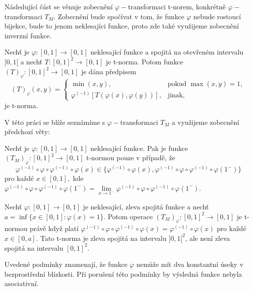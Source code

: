 Následující část se věnuje zobecn\v en\'i $\varphi-$transformaci t-norem, konkr\'etn\v e $\varphi-$transformaci $T_M.$ Zobecn\v en\'i bude spo\v c\'ivat v tom, \v ze funkce $\varphi$ nebude rostouc\'i bijekce, bude to jenom neklesaj\'ici funkce, proto zde tak\'e vyu\v zijeme zobecn\v en\'i inverzn\'i funkce. 
\begin{sentence}\cite{KMP}\label{subnorma}
     Nech\v t je $\varphi : [0,1] \rightarrow [0,1]$ neklesající funkce a  spojitá na otev\v ren\'em intervalu
 $]0,1[$ a nech\v t $T: [0,1]^2 \rightarrow [0,1]$ je t-norma. Potom funkce
    $(T)_\varphi : [0,1]^2 \rightarrow [0,1]$ je dána p\v redpisem $$(T)_\varphi (x,y)= \begin{cases} \min(x,y), & \mbox {pokud } \max(x,y) = 1,
    \\ \varphi^{(-1)}[T(\varphi(x), \varphi(y))], & \mbox {jinak,}
    \end{cases}$$
    je t-norma.
  \end{sentence}
  V této práci se blí\v ze seznámíme s $\varphi-$transformaci $T_M$ a využijeme zobecnění předchozí věty:

\begin{sentence} 
\cite{hlinena}
\label{smut} Nech\v t je $\varphi \colon [0,1] \to [0,1]$ neklesající funkce. Pak je funkce $(T_M)_\varphi\colon[0,1]^2\to[0,1]$  t-normou pouze v případě, že
$$\varphi^{(-1)}\circ\varphi\circ\varphi^{(-1)}\circ\varphi(x)\in \{\varphi^{(-1)}\circ\varphi(x),\varphi^{(-1)}\circ\varphi\circ\varphi^{(-1)}\circ\varphi(1^-)\}$$
pro každé $x\in[0,1],$ kde $\varphi^{(-1)}\circ\varphi\circ\varphi^{(-1)}\circ\varphi(1^-)=\lim\limits_{x\to 1^-}\varphi^{(-1)}\circ\varphi\circ\varphi^{(-1)}\circ\varphi(1^-).$
\end{sentence}
\begin{remark}
\cite{mitav}
    Nech\v t $\varphi\colon[0,1]\to [0,1]$ je neklesající, zleva spojitá  funkce a nechť $a=\inf\{x \in [0,1]\colon \varphi(x)=1\}.$ Potom operace $(T_M)_\varphi\colon[0,1]^2\to[0,1]$ je t-normou právě když platí $\varphi^{(-1)}\circ\varphi\circ\varphi^{(-1)}\circ\varphi(x)=\varphi^{(-1)}\circ\varphi(x)$ pro každé $x \in [0,a].$ Tato  t-norma je zleva spojitá na intervalu  $]0,1[^2$, ale není zleva spojitá na  intervalu $[0,1]^2.$
\end{remark}

Uveden\'e podm\'inky znamenaj\'i, \v ze funkce $\varphi$ nem\r u\v ze m\'it dva konstantn\'i \'useky v bezprost\v redn\'i bl\'izkosti. P\v ri poru\v sen\'i t\'eto podm\'inky by v\'ysledn\'a funkce nebyla asociativn\'i.
\bigskip


